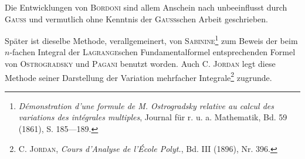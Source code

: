 Die Entwicklungen von \textsc{Bordoni} sind allem Anschein nach unbeeinflusst
durch \textsc{Gauss} und vermutlich ohne Kenntnis der \textsc{Gauss}schen Arbeit geschrieben.

Später ist dieselbe Methode, verallgemeinert, von \textsc{Sabinine}\footnote{\textit{Démonstration d'une formule de M. Ostrogradsky relative au calcul des variations des intégrales multiples}, Journal für r. u. a. Mathematik, Bd. 59 (1861), S. 185—189.} zum Beweis
der beim $n$-fachen Integral der \textsc{Lagrange}schen Fundamentalformel entsprechenden
Formel von \textsc{Ostrogradsky} und \textsc{Pagani} benutzt worden. Auch
\textsc{C. Jordan} legt diese Methode seiner Darstellung der Variation mehrfacher
Integrale\footnote{\textsc{C. Jordan}, \textit{Cours d'Analyse de l'École Polyt.}, Bd. III (1896), Nr. 396.} zugrunde.
\par\clearpage\endgroup
